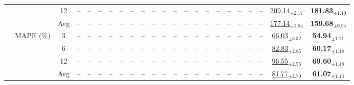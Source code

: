 \begin{table}[t]
{\begin{tabular}{ccc|cccc|cccc|cccc|cc|cccc|cc}
 &  & 12 & -- & -- & -- & -- & -- & -- & -- & -- & -- & -- & -- & -- & -- & -- & -- & -- & -- & -- & \underline{209.14$_{\pm2.17}$} & \textbf{181.83$_{\pm1.19}$} \\
 &  & Avg & -- & -- & -- & -- & -- & -- & -- & -- & -- & -- & -- & -- & -- & -- & -- & -- & -- & -- & \underline{177.14$_{\pm1.84}$} & \textbf{159.68$_{\pm0.54}$} \\
\cmidrule(lr){2-23}
 & \multirow{4}{*}{MAPE (\%)} & 3 & -- & -- & -- & -- & -- & -- & -- & -- & -- & -- & -- & -- & -- & -- & -- & -- & -- & -- & \underline{66.03$_{\pm3.32}$} & \textbf{54.94$_{\pm1.21}$} \\
 &  & 6 & -- & -- & -- & -- & -- & -- & -- & -- & -- & -- & -- & -- & -- & -- & -- & -- & -- & -- & \underline{82.83$_{\pm2.85}$} & \textbf{60.17$_{\pm1.18}$} \\
 &  & 12 & -- & -- & -- & -- & -- & -- & -- & -- & -- & -- & -- & -- & -- & -- & -- & -- & -- & -- & \underline{96.55$_{\pm2.55}$} & \textbf{69.60$_{\pm1.48}$} \\
 &  & Avg & -- & -- & -- & -- & -- & -- & -- & -- & -- & -- & -- & -- & -- & -- & -- & -- & -- & -- & \underline{81.77$_{\pm2.70}$} & \textbf{61.07$_{\pm1.13}$} \\
\bottomrule
\end{tabular}%
}
\end{table}

